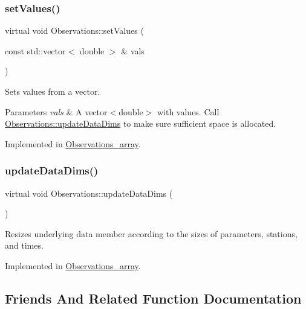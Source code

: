 \subsubsection{\texorpdfstring{set\+Values()}{setValues()}}
{\footnotesize\ttfamily virtual void Observations\+::set\+Values (\begin{DoxyParamCaption}\item[{const std\+::vector$<$ double $>$ \&}]{vals }\end{DoxyParamCaption})\hspace{0.3cm}{\ttfamily [pure virtual]}}

Sets values from a vector.


\begin{DoxyParams}{Parameters}
{\em vals} & A vector$<$double$>$ with values. Call \mbox{\hyperlink{class_observations_aab0540879c2d3fdf5f91d30ea2f902fd}{Observations\+::update\+Data\+Dims}} to make sure sufficient space is allocated. \\
\hline
\end{DoxyParams}


Implemented in \mbox{\hyperlink{class_observations__array_ae4ed49512506eae597a158d4c87dbd31}{Observations\+\_\+array}}.

\mbox{\label{class_observations_aab0540879c2d3fdf5f91d30ea2f902fd}} 
\subsubsection{\texorpdfstring{update\+Data\+Dims()}{updateDataDims()}}
{\footnotesize\ttfamily virtual void Observations\+::update\+Data\+Dims (\begin{DoxyParamCaption}{ }\end{DoxyParamCaption})\hspace{0.3cm}{\ttfamily [pure virtual]}}

Resizes underlying data member according to the sizes of parameters, stations, and times. 

Implemented in \mbox{\hyperlink{class_observations__array_aa9364c4356d1f8a2b430c93a1fcd021f}{Observations\+\_\+array}}.



\subsection{Friends And Related Function Documentation}
\mbox{\label{class_observations_ad93ae2b52ac4bae27e3419d1545ee68f}} 
